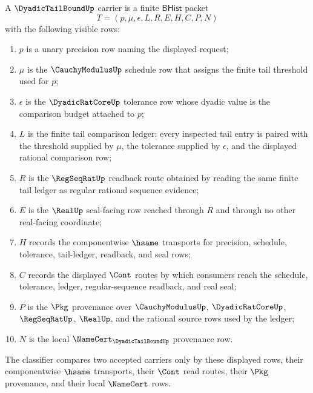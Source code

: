 \begin{definition}
\label{def:dyadic-tail-bound-carrier}
A $\DyadicTailBoundUp$ carrier is a finite $\mathsf{BHist}$ packet
$$
T=(p,\mu,\epsilon,L,R,E,H,C,P,N)
$$
with the following visible rows:
\begin{enumerate}
\item $p$ is a unary precision row naming the displayed request;
\item $\mu$ is the $\CauchyModulusUp$ schedule row that assigns the finite tail threshold used for $p$;
\item $\epsilon$ is the $\DyadicRatCoreUp$ tolerance row whose dyadic value is the comparison budget attached to $p$;
\item $L$ is the finite tail comparison ledger: every inspected tail entry is paired with the threshold supplied by $\mu$, the tolerance supplied by $\epsilon$, and the displayed rational comparison row;
\item $R$ is the $\RegSeqRatUp$ readback route obtained by reading the same finite tail ledger as regular rational sequence evidence;
\item $E$ is the $\RealUp$ seal-facing row reached through $R$ and through no other real-facing coordinate;
\item $H$ records the componentwise $\hsame$ transports for precision, schedule, tolerance, tail-ledger, readback, and seal rows;
\item $C$ records the displayed $\Cont$ routes by which consumers reach the schedule, tolerance, ledger, regular-sequence readback, and real seal;
\item $P$ is the $\Pkg$ provenance over $\CauchyModulusUp$, $\DyadicRatCoreUp$, $\RegSeqRatUp$, $\RealUp$, and the rational source rows used by the ledger;
\item $N$ is the local $\NameCert_{\DyadicTailBoundUp}$ provenance row.
\end{enumerate}
The classifier compares two accepted carriers only by these displayed rows, their componentwise $\hsame$ transports, their $\Cont$ read routes, their $\Pkg$ provenance, and their local $\NameCert$ rows.
\end{definition}

